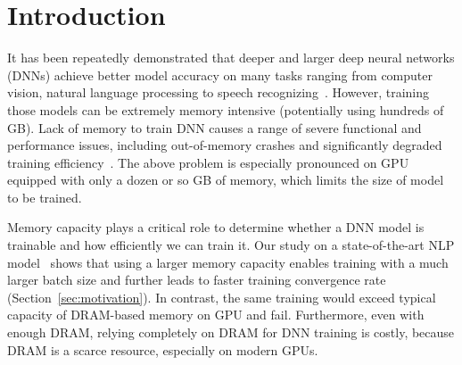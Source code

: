 \section{Introduction}

\textcolor{check}{It has been repeatedly demonstrated that deeper and larger deep neural networks (DNNs) achieve better model accuracy on many tasks ranging from computer vision, natural language processing to speech recognizing~\cite{radford2019language,devlin2018bert,he2015deep}. However, training those models can be extremely memory intensive (potentially using hundreds of GB). }
Lack of memory to train DNN causes a range of severe functional and performance issues, including out-of-memory crashes and significantly degraded training efficiency~\cite{Wang:2018:SDG:3178487.3178491,Rhu:2016:VVD:3195638.3195660}. The above problem is especially pronounced on GPU equipped with only a dozen or so GB of memory, which limits the size of model to be trained.

Memory capacity plays a critical role to determine whether a DNN model is trainable and how efficiently we can train it. Our study on a state-of-the-art NLP model~\cite{devlin2018bert} shows that using %
a larger memory capacity enables training with %
\textcolor{check}{a much larger batch size and further leads to faster training convergence rate %
(Section~\ref{sec:motivation})}. In contrast, the same training would exceed typical capacity of DRAM-based memory on GPU and fail. 
\textcolor{jie}{Furthermore, even with enough DRAM, relying completely on DRAM for DNN training is costly, because DRAM is a scarce resource, especially on modern GPUs.}%

